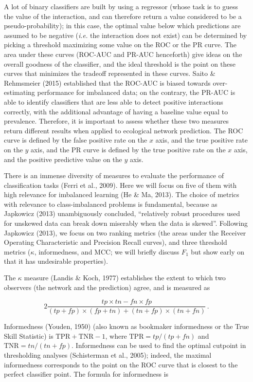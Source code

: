 \documentclass[11pt]{article}
\begin{document}
A lot of binary classifiers are built by using a regressor (whose task
is to guess the value of the interaction, and can therefore return a
value considered to be a pseudo-probability); in this case, the optimal
value below which predictions are assumed to be negative (\emph{i.e.}
the interaction does not exist) can be determined by picking a threshold
maximizing some value on the ROC or the PR curve. The area under these
curves (ROC-AUC and PR-AUC henceforth) give ideas on the overall
goodness of the classifier, and the ideal threshold is the point on
these curves that minimizes the tradeoff represented in these curves.
Saito \& Rehmsmeier (2015) established that the ROC-AUC is biased
towards over-estimating performance for imbalanced data; on the
contrary, the PR-AUC is able to identify classifiers that are less able
to detect positive interactions correctly, with the additional advantage
of having a baseline value equal to prevalence. Therefore, it is
important to assess whether these two measures return different results
when applied to ecological network prediction. The ROC curve is defined
by the false positive rate on the \(x\) axis, and the true positive rate
on the \(y\) axis, and the PR curve is defined by the true positive rate
on the \(x\) axis, and the positive predictive value on the \(y\) axis.

There is an immense diversity of measures to evaluate the performance of
classification tasks (Ferri et al., 2009). Here we will focus on five of
them with high relevance for imbalanced learning (He \& Ma, 2013). The
choice of metrics with relevance to class-imbalanced problems is
fundamental, because as Japkowicz (2013) unambiguously concluded,
``relatively robust procedures used for unskewed data can break down
miserably when the data is skewed''. Following Japkowicz (2013), we
focus on two ranking metrics (the areas under the Receiver Operating
Characteristic and Precision Recall curves), and three threshold metrics
(\(\kappa\), informedness, and MCC; we will briefly discuss \(F_1\) but
show early on that it has undesirable properties).

The \(\kappa\) measure (Landis \& Koch, 1977) establishes the extent to
which two observers (the network and the prediction) agree, and is
measured as

\[
2\frac{tp\times tn - fn\times fp}{(tp+fp)\times (fp+tn)+(tn+fp)\times (tn+fn)} \,.
\]

Informedness (Youden, 1950) (also known as bookmaker informedness or the
True Skill Statistic) is \(\text{TPR}+\text{TNR}-1\), where
\(\text{TPR}= tp/(tp+fn)\) and \(\text{TNR} = tn/(tn+fp)\). Informedness
can be used to find the optimal cutpoint in thresholding analyses
(Schisterman et al., 2005); indeed, the maximal informedness corresponds
to the point on the ROC curve that is closest to the perfect classifier
point. The formula for informedness is
\end{document}
